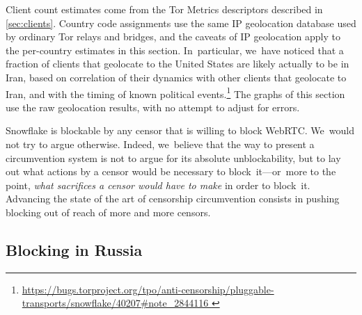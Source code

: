 \documentclass[letterpaper,twocolumn]{article}
\newlength{\urlfootnotesize}
\newcommand{\urlfootnote}[1]{\footnote{
\raggedright\hangindent\footnotemargin%
\fontsize{\urlfootnotesize}{\urlfootnotesize}\selectfont%
\url{#1}
}}
\begin{document}
Client count estimates come from the
Tor Metrics descriptors described in \autoref{sec:clients}.
Country code assignments use the same IP geolocation database
used by ordinary Tor relays and bridges,
and the caveats of IP geolocation apply to the per-country estimates in this section.
In~particular, we~have noticed that a fraction of clients
that geolocate to the United States are likely actually to be in Iran,
based on correlation of their dynamics with other clients that geolocate to Iran,
and with the timing of known political events.\urlfootnote{
https://bugs.torproject.org/tpo/anti-censorship/pluggable-transports/snowflake/40207\#note_2844116
}
The graphs of this section use the raw geolocation results,
with no attempt to adjust for errors.

Snowflake is blockable by any censor that is willing to block WebRTC.
We~would not try to argue otherwise.
Indeed, we~believe that the way to present a circumvention system is
not to argue for its absolute unblockability,
but to lay out
what actions by a censor would be necessary to block~it---or~more
to the point,
\emph{what sacrifices a censor would have to make}
in order to block~it.
Advancing the state of the art of censorship circumvention
consists in pushing blocking
out of reach of more and more censors.

\subsection{Blocking in Russia}
\label{sec:block-ru}
\end{document}
